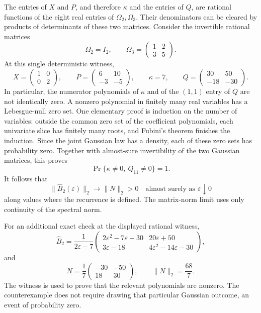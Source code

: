 \documentclass[10pt,a4paper]{article}
\begin{document}
The entries of \(X\) and \(P\), and therefore \(\kappa\) and the entries of \(Q\), are rational functions of the eight real entries of \(\Omega_2,\Omega_3\). Their denominators can be cleared by products of determinants of these two matrices. Consider the invertible rational matrices \nopagebreak[3]
\[
\Omega_2=I_2,\qquad
\Omega_3=
\begin{pmatrix}1&2\\3&5\end{pmatrix}.
\] At this single deterministic witness, \nopagebreak[3]
\[
X=\begin{pmatrix}1&0\\0&2\end{pmatrix},\qquad
P=\begin{pmatrix}6&10\\-3&-5\end{pmatrix},\qquad
\kappa=7,\qquad
Q=\begin{pmatrix}30&50\\-18&-30\end{pmatrix}.
\] In particular, the numerator polynomials of \(\kappa\) and of the \((1,1)\) entry of \(Q\) are not identically zero. A nonzero polynomial in finitely many real variables has a Lebesgue-null zero set. One elementary proof is induction on the number of variables: outside the common zero set of the coefficient polynomials, each univariate slice has finitely many roots, and Fubini's theorem finishes the induction. Since the joint Gaussian law has a density, each of these zero sets has probability zero. Together with almost-sure invertibility of the two Gaussian matrices, this proves \nopagebreak[3]
\[
\Pr\{\kappa\ne0,\ Q_{11}\ne0\}=1.
\] It follows that \nopagebreak[3]
\[
\|\widehat B_2(\varepsilon)\|_2\longrightarrow\|N\|_2>0
\quad\text{almost surely as }\varepsilon\downarrow0
\] along values where the recurrence is defined. The matrix-norm limit uses only continuity of the spectral norm.

For an additional exact check at the displayed rational witness, \nopagebreak[3]
\[
\widehat B_2
=\frac1{2\varepsilon-7}
\begin{pmatrix}
2\varepsilon^2-7\varepsilon+30&20\varepsilon+50\\
3\varepsilon-18&4\varepsilon^2-14\varepsilon-30
\end{pmatrix},
\] and \nopagebreak[3]
\[
N=\frac17\begin{pmatrix}-30&-50\\18&30\end{pmatrix},
\qquad \|N\|_2=\frac{68}{7}.
\] The witness is used to prove that the relevant polynomials are nonzero. The counterexample does not require drawing that particular Gaussian outcome, an event of probability zero.
\end{document}
